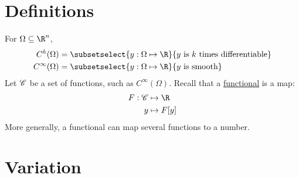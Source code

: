 \documentclass[../Main.tex]{subfiles}
\begin{document}
\section{Definitions}
For $\Omega \subseteq \R^n$,
\begin{align*}
    C^k(\Omega) &= \subsetselect{y : \Omega \mapsto \R}{y \text{ is } k \text{ times differentiable}} \\
    C^\infty(\Omega) &= \subsetselect{y : \Omega \mapsto \R}{y \text{ is smooth}}
\end{align*}
Let $\mathscr{C}$ be a set of functions, such as $C^\infty(\Omega)$. Recall that a \underline{functional} is a map:
\begin{align*}
    F : \funcset &\mapsto \R \\
    y &\mapsto F[y]
\end{align*}
More generally, a functional can map several functions to a number.
\section{Variation}
\end{document}
